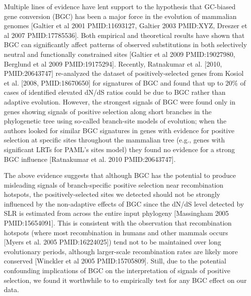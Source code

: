 Multiple lines of evidence have lent support to the hypothesis that
GC-biased gene conversion (BGC) has been a major force in the
evolution of mammalian genomes [Galtier et al 2001 PMID:11693127,
  Galtier 2003 PMID:XYZ, Dreszer et al 2007 PMID:17785536]. Both
empirical and theoretical results have shown that BGC can
significantly affect patterns of observed substitutions in both
selectively neutral and functionally constrained sites [Galtier et al
  2009 PMID:19027980, Berglund et al 2009 PMID:19175294]. Recently,
Ratnakumar et al. [2010, PMID:20643747] re-analyzed the dataset of
positively-selected genes from Kosiol et al. [2008, PMID:18670650] for
signatures of BGC and found that up to 20\% of cases of identified
elevated dN/dS ratios could be due to BGC rather than adaptive
evolution. However, the strongest signals of BGC were found only in
genes showing signals of positive selection along short branches in
the phylogenetic tree using so-called branch-site models of evolution;
when the authors looked for similar BGC signatures in genes with
evidence for positive selection at specific sites throughout the
mammalian tree (e.g., genes with significant LRTs for PAML’s sites
model) they found no evidence for a strong BGC influence [Ratnakumar
  et al. 2010 PMID:20643747].

The above evidence suggests that although BGC has the potential to
produce misleading signals of branch-specific positive selection near
recombination hotspots, the positively-selected sites we detected
should not be strongly influenced by the non-adaptive effects of BGC
since the dN/dS level detected by SLR is estimated from across the
entire input phylogeny [Massingham 2005 PMID:15654091]. This is
consistent with the observation that recombination hotspots (where
most recombination in humans and other mammals occurs [Myers et
  al. 2005 PMID:16224025]) tend not to be maintained over long
evolutionary periods, although larger-scale recombination rates are
likely more conserved [Winckler et al 2005 PMID:15705809]. Still, due
to the potential confounding implications of BGC on the interpretation
of signals of positive selection, we found it worthwhile to to
empirically test for any BGC effect on our data.

